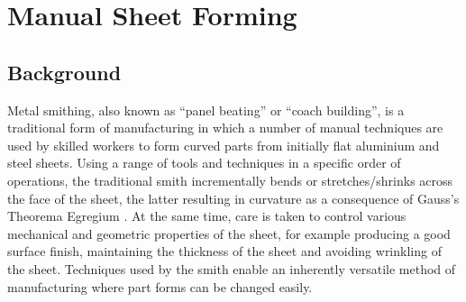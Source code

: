 \newpage
\section{Manual Sheet Forming}\label{sec:Manual}
\subsection{Background}\label{sec:ManualBackground}
Metal smithing, also known as ``panel beating'' or ``coach building'', is a traditional form of manufacturing in which a number of manual techniques are used by skilled workers to form curved parts from initially flat aluminium and steel sheets. Using a range of tools and techniques in a specific order of operations, the traditional smith incrementally bends or stretches/shrinks across the face of the sheet, the latter resulting in curvature as a consequence of Gauss's Theorema Egregium \citep{Pressley2001ElementaryGeometry}. At the same time, care is taken to control various mechanical and geometric properties of the sheet, for example producing a good surface finish, maintaining the thickness of the sheet and avoiding wrinkling of the sheet. Techniques used by the smith enable an inherently versatile method of manufacturing where part forms can be changed easily.

